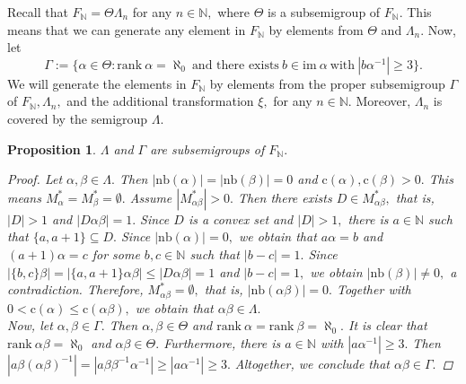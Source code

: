 \documentclass[11pt]{article}
\theoremstyle{plain}
\newtheorem{proposition}[theorem]{Proposition}
\theoremstyle{definition}
\newcommand{\rank}{\mathrm{rank~}}
\newcommand{\im}{\mathrm{im~}}
\newcommand{\collapse}{\mathrm{c}}
\newcommand{\nb}{\mathrm{nb}}
\begin{document}
Recall that $F_{\mathbb{N}}=\Theta\Lambda_{n}$ for any $n\in\mathbb{N},$ where $\Theta$ is a subsemigroup of $F_{\mathbb{N}}.$ This means that we can generate any element in $F_{\mathbb{N}}$ by elements from $\Theta$ and $\Lambda_{n}.$ Now, let $$\Gamma:=\{\alpha\in \Theta: \rank\alpha=\aleph_{0}~\text{and there exists}~b\in\im\alpha~\text{with}~\left\vert b\alpha^{-1}\right\vert\geq 3\}.$$
We will generate the elements in $F_{\mathbb{N}}$ by elements from the proper subsemigroup $\Gamma$ of $F_{\mathbb{N}},\Lambda_{n},$ and the additional transformation $\xi,$ for any $n\in\mathbb{N}.$ Moreover, $\Lambda_{n}$ is covered by the semigroup $\Lambda.$


\begin{proposition}\label{Proposition9}
$\Lambda$ and $\Gamma$ are subsemigroups of $F_{\mathbb{N}}.$
\begin{proof}
Let $\alpha,\beta\in\Lambda.$ Then $\left\vert\nb(\alpha)\right\vert=\left\vert\nb(\beta)\right\vert=0$ and $\collapse(\alpha),\collapse(\beta)>0.$ This means $M_{\alpha}^{*}=M_{\beta}^{*}=\emptyset.$ Assume $\left\vert M_{\alpha\beta}^{*}\right\vert>0.$ Then there exists $D\in M_{\alpha\beta}^{*},$ that is, $\left\vert D\right\vert>1$ and $\left\vert D\alpha\beta\right\vert=1.$ Since $D$ is a convex set and $\left\vert D\right\vert>1,$ there is $a\in\mathbb{N}$ such that $\{a,a+1\}\subseteq D.$ Since $\left\vert\nb(\alpha)\right\vert=0,$ we obtain that $a\alpha=b$ and $(a+1)\alpha=c$ for some $b,c\in\mathbb{N}$ such that $\left\vert b-c\right\vert=1.$ Since $\left\vert\{b,c\}\beta\right\vert=\left\vert \{a,a+1\}\alpha\beta\right\vert\leq\left\vert D\alpha\beta\right\vert=1$ and $\left\vert b-c\right\vert=1,$ we obtain $\left\vert\nb(\beta)\right\vert\not=0,$ a contradiction. Therefore, $M_{\alpha\beta}^{*}=\emptyset,$ that is, $\left\vert \nb(\alpha\beta)\right\vert=0.$ Together with $0<\collapse(\alpha)\leq\collapse(\alpha\beta),$ we obtain that $\alpha\beta\in\Lambda.$\\

Now, let $\alpha,\beta\in\Gamma.$ Then $\alpha,\beta\in\Theta$ and $\rank\alpha=\rank\beta=\aleph_{0}.$ It is clear that $\rank\alpha\beta=\aleph_{0}$ and $\alpha\beta\in\Theta.$ Furthermore, there is $a\in\mathbb{N}$ with $\left\vert a\alpha^{-1}\right\vert\geq 3.$ Then $\left\vert a\beta(\alpha\beta)^{-1}\right\vert=\left\vert a\beta\beta^{-1}\alpha^{-1}\right\vert\geq\left\vert a\alpha^{-1}\right\vert\geq 3.$ Altogether, we conclude that $\alpha\beta\in\Gamma.$
\end{proof} 
\end{proposition}
\end{document}
